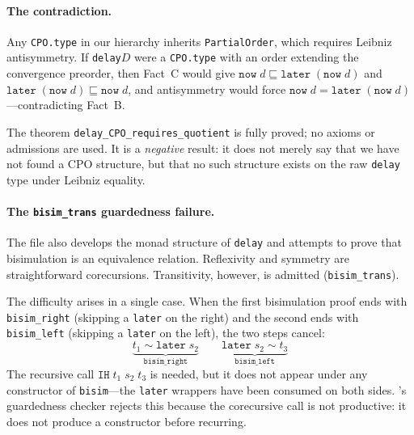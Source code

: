 \paragraph{The contradiction.}
Any \texttt{CPO.type} in our hierarchy inherits
\texttt{PartialOrder}, which requires Leibniz antisymmetry.
If \texttt{delay}\;$D$ were a \texttt{CPO.type} with an order
extending the convergence preorder, then Fact~C would give
$\texttt{now}\;d \sqsubseteq \texttt{later}\;(\texttt{now}\;d)$
and
$\texttt{later}\;(\texttt{now}\;d) \sqsubseteq \texttt{now}\;d$,
and antisymmetry would force
$\texttt{now}\;d = \texttt{later}\;(\texttt{now}\;d)$---contradicting
Fact~B.

The theorem \texttt{delay\_CPO\_requires\_quotient} is fully proved;
no axioms or admissions are used.
It is a \emph{negative} result: it does not merely say that we have
not found a CPO structure, but that no such structure exists on the
raw \texttt{delay} type under Leibniz equality.

\paragraph{The \texttt{bisim\_trans} guardedness failure.}
The file also develops the monad structure of \texttt{delay} and
attempts to prove that bisimulation is an equivalence relation.
Reflexivity and symmetry are straightforward corecursions.
Transitivity, however, is admitted (\texttt{bisim\_trans}).

The difficulty arises in a single case.
When the first bisimulation proof ends with \texttt{bisim\_right}
(skipping a \texttt{later} on the right) and the second ends with
\texttt{bisim\_left} (skipping a \texttt{later} on the left), the
two steps cancel:
\[
  \underbrace{t_1 \sim \texttt{later}\;s_2}_{\texttt{bisim\_right}}
  \qquad
  \underbrace{\texttt{later}\;s_2 \sim t_3}_{\texttt{bisim\_left}}
\]
The recursive call $\texttt{IH}\;t_1\;s_2\;t_3$ is needed, but it
does not appear under any constructor of \texttt{bisim}---the
\texttt{later} wrappers have been consumed on both sides.
\Rocq{}'s guardedness checker rejects this because the corecursive
call is not productive: it does not produce a constructor before
recurring.

